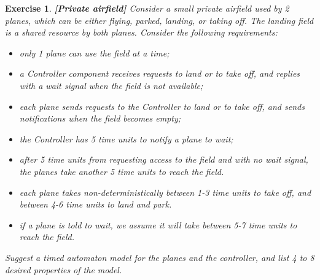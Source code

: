 \documentclass[11pt]{article}
\theoremstyle{myplain}
\newtheorem{exercise}{Exercise}
\theoremstyle{definition} %
\begin{document}

\begin{exercise} \label{ex:airfield}
\textbf{[Private airfield]}
Consider a small private airfield used by 2 planes, which can be either flying, parked, landing, or taking off. The landing field is a shared resource by both planes. Consider the following requirements:
\begin{itemize}
  \setlength\itemsep{0.3mm}
  \item only 1 plane can use the field at a time;
  \item a Controller component receives requests to land or to take off, and replies with a wait signal when the field is not available;
  \item each plane sends requests to the Controller to land or to take off, and sends notifications when the field becomes empty;
  \item the Controller has 5 time units to notify a plane to wait;
  \item after 5 time units from requesting access to the field and with no wait signal, the planes take another 5 time units to reach the field.
  \item each plane takes non-deterministically between 1-3 time units to take off, and between 4-6 time units to land and park.
  \item if a plane is told to wait, we assume it will take between 5-7 time units to reach the field.
\end{itemize}

Suggest a timed automaton model for the planes and the controller, and list 4 to 8 desired properties of the model.
\end{exercise}
\end{document}
